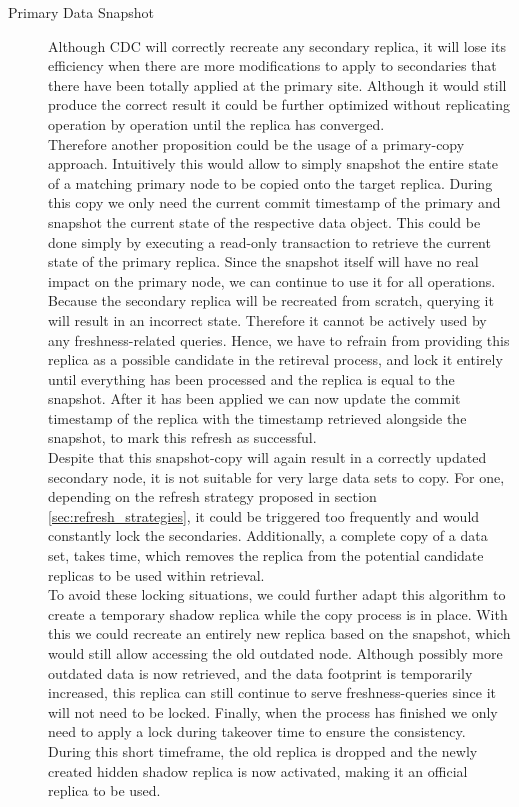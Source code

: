 \begin{description}
    \item [Primary Data Snapshot]
    Although CDC will correctly recreate any secondary replica, it will lose its efficiency when there are more modifications to apply to secondaries that there 
    have been totally applied at the primary site. Although it would still produce the correct result it could be further optimized without replicating operation by operation 
    until the replica has converged.\\
    Therefore another proposition could be the usage of a primary-copy approach. 
    Intuitively this would allow to simply snapshot the entire state of a matching primary node to be copied onto the target replica.
    During this copy we only need the current commit timestamp of the primary and snapshot the current state of the respective data object. 
    This could be done simply by executing a read-only transaction to retrieve the current state of the primary replica.
    Since the snapshot itself will have no real impact on the primary node, we can continue to use it for all operations.
    Because the secondary replica will be recreated from scratch, querying it will result in an incorrect state. 
    Therefore it cannot be actively used by any freshness-related queries.
    Hence, we have to refrain from providing this replica as a possible candidate in the retireval process, and lock it entirely 
    until everything has been processed and the replica is equal to the snapshot. After it has been applied we can now update the commit timestamp of the replica
    with the timestamp retrieved alongside the snapshot, to mark this refresh as successful.\\
    Despite that this snapshot-copy will again result in a correctly updated secondary node, it is not suitable for very large data sets to copy.  
    For one, depending on the refresh strategy proposed in section \ref{sec:refresh_strategies}, it could be triggered too frequently and would constantly lock the 
    secondaries. Additionally, a complete copy of a data set, takes time, which removes the replica from the potential candidate replicas to be used within retrieval.\\
    To avoid these locking situations, we could further adapt this algorithm to create a temporary shadow replica while the copy process is in place.
    With this we could recreate an entirely new replica based on the snapshot, which would still allow accessing the old outdated node.
    Although possibly more outdated data is now retrieved, and the data footprint is temporarily increased, this replica can still continue to serve freshness-queries 
    since it will not need to be locked.
    Finally, when the process has finished we only need to apply a lock during takeover time to ensure the consistency. During this short timeframe, the old replica is dropped
    and the newly created hidden shadow replica is now activated, making it an official replica to be used.




\end{description}
